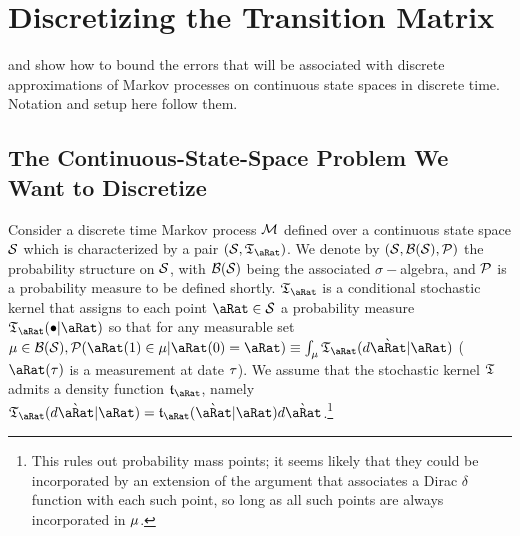 \documentclass[\econtexRoot/BufferStockTheory.tex]{subfiles}
\begin{document}
\section{Discretizing the Transition Matrix}

\cite{saDiscrete} and \cite{saQuantitative} show how to bound the errors that will be associated with discrete approximations of Markov processes on continuous state spaces in discrete time.  Notation and setup here follow them.

\subsection{The Continuous-State-Space Problem We Want to Discretize} 
Consider a discrete time Markov process $\mathcal{M}$ defined over a continuous state space $\mathcal{S}$ which is characterized by a pair $(\SetFullCnts,\KrnPntNxtFmPntNow_{\pnt})$.   We denote by $(\mathcal{S},\mathcal{B}(\mathcal{S}),\mathcal{P})$ the probability structure on $\mathcal{S}$, with $\mathcal{B}(\mathcal{S})$ being the associated $\sigma-$algebra, and $\mathcal{P}$ is a probability measure to be defined shortly. $\KrnPntNxtFmPntNow_{\pnt}$ is a conditional stochastic kernel  that assigns to each point $\pnt \in \SetFullCnts$ a probability measure $\KrnPntNxtFmPntNow_{\pnt}(\bullet|\pnt)$ so that for any measurable set $\SetPartCnts \in \Borel(\SetFullCnts), \PrbFullCnts(\pnt(1) \in \SetPartCnts|\pnt(0)=\pnt) \equiv \int_{\SetPartCnts}\KrnPntNxtFmPntNow_{\pnt}(d\Nxt{\pnt}|\pnt)$ ($\pnt(\tAbs)$ is a measurement at date $\tau$).  We assume that the stochastic kernel $\mathfrak{T}$ admits a density function $\DnsPntNxtFmPntNow_{\pnt}$, namely $\KrnPntNxtFmPntNow_{\pnt}(d\Nxt{\pnt}|\pnt) = \DnsPntNxtFmPntNow_{\pnt}(\Nxt{\pnt}|\pnt)d\Nxt{\pnt}$.\footnote{This rules out probability mass points; it seems likely that they could be incorporated by an extension of the argument that associates a Dirac $\delta$ function with each such point, so long as all such points are always incorporated in $\mu$.}
\end{document}
